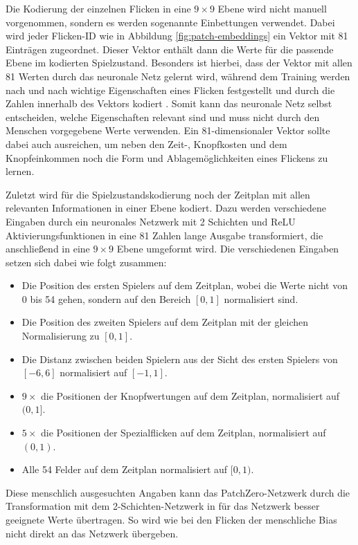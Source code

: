 Die Kodierung der einzelnen Flicken in eine $9\times 9$ Ebene wird nicht manuell vorgenommen, sondern es werden sogenannte Einbettungen verwendet. Dabei wird jeder Flicken-\ac{ID} wie in Abbildung \ref{fig:patch-embeddings} ein Vektor mit 81 Einträgen zugeordnet. Dieser Vektor enthält dann die Werte für die passende Ebene im kodierten Spielzustand. Besonders ist hierbei, dass der Vektor mit allen 81 Werten durch das neuronale Netz gelernt wird, \dash während dem Training werden nach und nach wichtige Eigenschaften eines Flicken festgestellt und durch die Zahlen innerhalb des Vektors kodiert \cite{2023.PytorchEmbedding}. Somit kann das neuronale Netz selbst entscheiden, welche Eigenschaften relevant sind und muss nicht durch den Menschen vorgegebene Werte verwenden. Ein 81-dimensionaler Vektor sollte dabei auch ausreichen, um neben den Zeit-, Knopfkosten und dem Knopfeinkommen noch die Form und Ablagemöglichkeiten eines Flickens zu lernen.

Zuletzt wird für die Spielzustandskodierung noch der Zeitplan mit allen relevanten Informationen in einer Ebene kodiert. Dazu werden verschiedene Eingaben durch ein neuronales Netzwerk mit 2 Schichten und \ac{ReLU} Aktivierungsfunktionen in eine 81 Zahlen lange Ausgabe transformiert, die anschließend in eine $9\times 9$ Ebene umgeformt wird. Die verschiedenen Eingaben setzen sich dabei wie folgt zusammen:

\begin{itemize}
    \item Die Position des ersten Spielers auf dem Zeitplan, wobei die Werte nicht von 0 bis 54 gehen, sondern auf den Bereich $\left[0,1\right]$ normalisiert sind.
    \item Die Position des zweiten Spielers auf dem Zeitplan mit der gleichen Normalisierung zu $\left[0,1\right]$.
    \item Die Distanz zwischen beiden Spielern aus der Sicht des ersten Spielers von $\left[-6,6\right]$ normalisiert auf $\left[-1,1\right]$.
    \item $9\times$ die Positionen der Knopfwertungen auf dem Zeitplan, normalisiert auf $(0,1]$.
    \item $5\times$ die Positionen der Spezialflicken auf dem Zeitplan, normalisiert auf $(0,1)$.
    \item Alle 54 Felder auf dem Zeitplan normalisiert auf $[0,1)$.
\end{itemize}

Diese menschlich ausgesuchten Angaben kann das PatchZero-Netzwerk durch die Transformation mit dem 2-Schichten-Netzwerk in für das Netzwerk besser geeignete Werte übertragen. So wird wie bei den Flicken der menschliche Bias nicht direkt an das Netzwerk übergeben.

